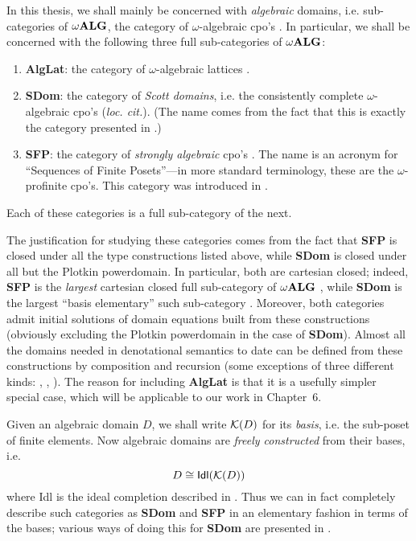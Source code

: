 In this thesis, we shall mainly be concerned with {\em algebraic} domains, i.e. sub-categories of $\omega {\bf ALG}$, the category of $\omega$-algebraic cpo's 
\cite[Chapter 6 p.\  2]{PloLN}.
In particular, we shall be concerned with the following three full sub-categories of $\omega {\bf ALG}$:
\begin{enumerate}
\item {\bf AlgLat}: the category of $\omega$-algebraic lattices 
\cite[Chapter 6 p.\  13]{PloLN}.
\item {\bf SDom}: the category of {\em Scott domains}, i.e. the consistently complete $\omega$-algebraic cpo's ({\it loc. cit.}).
(The name comes from the fact that this is exactly the category presented in \cite{Sco81,Sco82}.)
\item {\bf SFP}: the category of {\em strongly algebraic} cpo's 
\cite[Chapter 6 p.\  17]{PloLN}.
The name is an acronym for ``Sequences of Finite Posets''---in more standard terminology, these are the $\omega$-profinite cpo's.
This category was introduced in \cite{Plo76}.
\end{enumerate}
Each of these categories is a full sub-category of the next.

The justification for studying these categories comes from the fact that 
{\bf SFP} is closed under all the type constructions listed above, while 
{\bf SDom} is closed under all but the Plotkin powerdomain.
In particular, both are cartesian closed; indeed, {\bf SFP} is the 
{\em largest} cartesian closed full sub-category of $\omega {\bf ALG}$ 
\cite{Smy83a}, while {\bf SDom} is the largest ``basis elementary'' such sub-category \cite{Gun86}.
Moreover, both categories admit initial solutions of domain equations built from these constructions (obviously excluding the Plotkin powerdomain in the case of {\bf SDom}).
Almost all the domains needed in denotational semantics to date can be defined from these constructions by composition and recursion (some exceptions of three different kinds: \cite{Abr83}, \cite{Ole85}, \cite{Plo82}).
The reason for including {\bf AlgLat} is that it is a usefully simpler special case, which will be applicable to our work in Chapter~6.

Given an algebraic domain $D$, we shall write ${\cal K}(D)$ for its {\it basis}, i.e. the sub-poset of finite elements.
Now algebraic domains are {\em freely constructed} from their bases, i.e.
\[ D \cong {\sf Idl}({\cal K}(D)) \]
where {\sf Idl} is the ideal completion described in \cite[Chapter 6 p.\  5]{PloLN}.
Thus we can in fact completely describe such categories as {\bf SDom} and {\bf SFP} in an elementary fashion in terms of the bases; various ways of doing this for {\bf SDom} are presented in \cite{Sco81,Sco82}.

